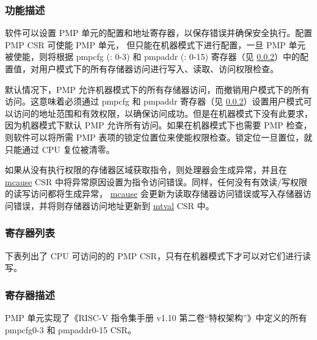 \documentclass[main\_\_CN.tex]{subfiles}
\begin{document}
\subsubsection{功能描述}
\label{sec:riscvcpu-pmp-func-descr}

软件可以设置 PMP 单元的配置和地址寄存器，以保存错误并确保安全执行。配置 PMP CSR 可使能 PMP 单元， 但只能在机器模式下进行配置，一旦 PMP 单元被使能，则将根据 pmpcfg (: 0-3) 和 pmpaddr (: 0-15) 寄存器（见 \ref{sec:riscvcpu-pmp-reg-summ}）中的配置值，对用户模式下的所有存储器访问进行写入、读取、访问权限检查。

默认情况下，PMP 允许机器模式下的所有存储器访问，而撤销用户模式下的所有访问。这意味着必须通过 pmpcfg 和 pmpaddr 寄存器（见 \ref{sec:riscvcpu-pmp-reg-summ}）设置用户模式可以访问的地址范围和有效权限，以确保访问成功。但是在机器模式下没有此要求，因为机器模式下默认 PMP 允许所有访问。如果在机器模式下也需要 PMP 检查，则软件可以将所需 PMP 表项的锁定位置位来使能权限检查。锁定位一旦置位，就只能通过 CPU 复位被清零。

如果从没有执行权限的存储器区域获取指令，则处理器会生成异常，并且在 \hyperref[regdesc:MCAUSE]{mcause} CSR 中将异常原因设置为指令访问错误。同样，任何没有有效读/写权限的读写访问都将生成异常， \hyperref[regdesc:MCAUSE]{mcause} 会更新为读取存储器访问错误或写入存储器访问错误，并将则存储器访问地址更新到 \hyperref[regdesc:MTVAL]{mtval} CSR 中。


\newpage
\hypertarget{riscvcpu-pmp-reg-summ}{}
\subsubsection{寄存器列表}
\label{sec:riscvcpu-pmp-reg-summ}

下表列出了 CPU 可访问的的 PMP CSR，只有在机器模式下才可以对它们进行读写。




\subsubsection{寄存器描述}
\label{sec:riscvcpu-pmp-reg-desc}

PMP 单元实现了《RISC-V 指令集手册 v1.10 第二卷“特权架构”》中定义的所有 pmpcfg0-3 和 pmpaddr0-15 CSR。
\end{document}
